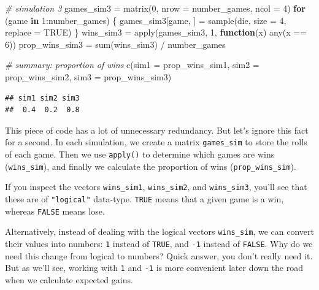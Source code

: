 \documentclass[
]{book}
\newenvironment{Shaded}{\begin{snugshade}}{\end{snugshade}}
\newcommand{\AttributeTok}[1]{\textcolor[rgb]{0.77,0.63,0.00}{#1}}
\newcommand{\CommentTok}[1]{\textcolor[rgb]{0.56,0.35,0.01}{\textit{#1}}}
\newcommand{\ConstantTok}[1]{\textcolor[rgb]{0.00,0.00,0.00}{#1}}
\newcommand{\ControlFlowTok}[1]{\textcolor[rgb]{0.13,0.29,0.53}{\textbf{#1}}}
\newcommand{\DecValTok}[1]{\textcolor[rgb]{0.00,0.00,0.81}{#1}}
\newcommand{\FunctionTok}[1]{\textcolor[rgb]{0.00,0.00,0.00}{#1}}
\newcommand{\NormalTok}[1]{#1}
\newcommand{\OtherTok}[1]{\textcolor[rgb]{0.56,0.35,0.01}{#1}}
\newcommand{\SpecialCharTok}[1]{\textcolor[rgb]{0.00,0.00,0.00}{#1}}
\newcommand{\StringTok}[1]{\textcolor[rgb]{0.31,0.60,0.02}{#1}}
\begin{document}
\begin{Shaded}
\begin{Highlighting}[]
\CommentTok{\# simulation 3}
\NormalTok{games\_sim3 }\OtherTok{=} \FunctionTok{matrix}\NormalTok{(}\DecValTok{0}\NormalTok{, }\AttributeTok{nrow =}\NormalTok{ number\_games, }\AttributeTok{ncol =} \DecValTok{4}\NormalTok{)}
\ControlFlowTok{for}\NormalTok{ (game }\ControlFlowTok{in} \DecValTok{1}\SpecialCharTok{:}\NormalTok{number\_games) \{}
\NormalTok{  games\_sim3[game, ] }\OtherTok{=} \FunctionTok{sample}\NormalTok{(die, }\AttributeTok{size =} \DecValTok{4}\NormalTok{, }\AttributeTok{replace =} \ConstantTok{TRUE}\NormalTok{)}
\NormalTok{\}}
\NormalTok{wins\_sim3 }\OtherTok{=} \FunctionTok{apply}\NormalTok{(games\_sim3, }\DecValTok{1}\NormalTok{, }\ControlFlowTok{function}\NormalTok{(x) }\FunctionTok{any}\NormalTok{(x }\SpecialCharTok{==} \DecValTok{6}\NormalTok{))}
\NormalTok{prop\_wins\_sim3 }\OtherTok{=} \FunctionTok{sum}\NormalTok{(wins\_sim3) }\SpecialCharTok{/}\NormalTok{ number\_games}


\CommentTok{\# summary: proportion of wins}
\FunctionTok{c}\NormalTok{(}\StringTok{\textquotesingle{}sim1\textquotesingle{}} \OtherTok{=}\NormalTok{ prop\_wins\_sim1,}
  \StringTok{\textquotesingle{}sim2\textquotesingle{}} \OtherTok{=}\NormalTok{ prop\_wins\_sim2,}
  \StringTok{\textquotesingle{}sim3\textquotesingle{}} \OtherTok{=}\NormalTok{ prop\_wins\_sim3)}
\end{Highlighting}
\end{Shaded}

\begin{verbatim}
## sim1 sim2 sim3 
##  0.4  0.2  0.8
\end{verbatim}

This piece of code has a lot of unnecessary redundancy. But let's ignore this
fact for a second. In each simulation, we create a matrix \texttt{games\_sim} to store
the rolls of each game. Then we use \texttt{apply()} to determine which games are wins
(\texttt{wins\_sim}), and finally we calculate the proportion of wins (\texttt{prop\_wins\_sim}).

If you inspect the vectors \texttt{wins\_sim1}, \texttt{wins\_sim2}, and \texttt{wins\_sim3}, you'll
see that these are of \texttt{"logical"} data-type. \texttt{TRUE} means that a given game
is a win, whereas \texttt{FALSE} means lose.

Alternatively, instead of dealing with the logical vectors \texttt{wins\_sim}, we
can convert their values into numbers: \texttt{1} instead of \texttt{TRUE}, and \texttt{-1} instead
of \texttt{FALSE}. Why do we need this change from logical to numbers? Quick
answer, you don't really need it. But as we'll see, working with \texttt{1} and \texttt{-1}
is more convenient later down the road when we calculate expected gains.
\end{document}
